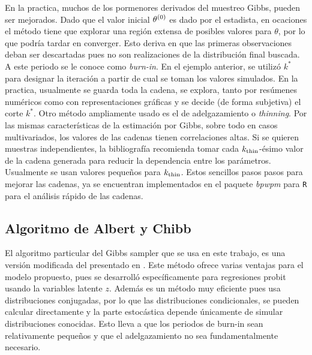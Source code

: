 \documentclass[../Main/Main.tex]{subfiles}
\begin{document}
En la practica, muchos de los pormenores derivados del muestreo Gibbs, pueden ser mejorados. Dado que el valor inicial $\theta^{(0)}$ es dado por el estadista, en ocaciones el método tiene que explorar una región extensa de posibles valores para $\theta$, por lo que podría tardar en converger. Esto deriva en que las primeras observaciones deban ser descartadas pues no son realizaciones de la distribución final buscada. A este periodo se le conoce como \textit{burn-in}. En el ejemplo anterior, se utilizó $k^*$ para designar la iteración a partir de cual se toman los valores simulados. En la practica, usualmente se guarda toda la cadena, se explora, tanto por resúmenes numéricos como con representaciones gráficas y se decide (de forma subjetiva) el corte  $k^*$. Otro método ampliamente usado es el de adelgazamiento o \textit{thinning}. Por las mismas características de la estimación por Gibbs, sobre todo en casos multivariados, los valores de las cadenas tienen correlaciones altas. Si se quieren muestras independientes, la bibliografía recomienda tomar cada $k_{\text{thin}}$-ésimo valor de la cadena generada para reducir la dependencia entre los parámetros. Usualmente se usan valores pequeños para $k_{\text{thin}}$.  Estos sencillos pasos pasos para mejorar las cadenas, ya se encuentran implementados en el paquete \textit{bpwpm} para \verb|R| para el análisis rápido de las cadenas.

\subsection{Algoritmo de Albert y Chibb}
El algoritmo particular del Gibbs sampler que se usa en este trabajo, es una versión modificada del presentado en \autocite{albert1993bayesian}. Este método ofrece varias ventajas para el modelo propuesto, pues se desarrolló específicamente para regresiones probit usando la variables latente $z$. Además es un método muy eficiente pues usa distribuciones conjugadas, por lo que las distribuciones condicionales, se pueden calcular directamente y la parte estocástica depende únicamente de simular distribuciones conocidas. Esto lleva a que los periodos de burn-in sean relativamente pequeños y que el adelgazamiento no sea fundamentalmente necesario.\\
\end{document}
